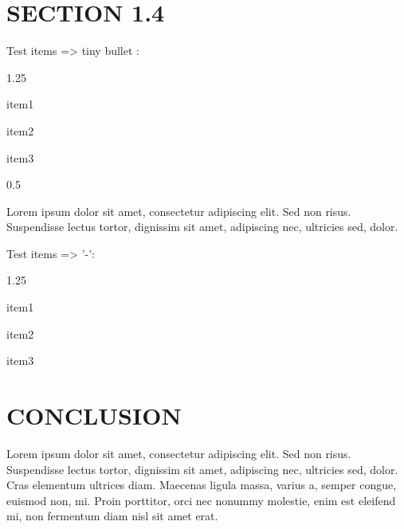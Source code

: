 \section{SECTION 1.4}
Test items => tiny bullet :
\renewcommand{\labelitemi}{\tiny$\bullet$}
\begin{itemize}[leftmargin=2cm, topsep=0pt]
        \begin{spacing}{1.25}
        \item item1
        \item item2
        \item item3
        \end{spacing}
\end{itemize}
\begin{spacing}{0.5}
\end{spacing}
Lorem ipsum dolor sit amet, consectetur adipiscing elit. Sed non risus. Suspendisse lectus tortor, dignissim sit amet, adipiscing nec, ultricies sed, dolor.

Test items => '-':
\renewcommand{\labelitemi}{\tiny$-$}
\begin{itemize}[leftmargin=2cm, topsep=0pt]
        \begin{spacing}{1.25}
        \item item1
        \item item2
        \item item3
        \end{spacing}
\end{itemize}


\section{CONCLUSION}
Lorem ipsum dolor sit amet, consectetur adipiscing elit. Sed non risus. Suspendisse lectus tortor, dignissim sit amet, adipiscing nec, ultricies sed, dolor. Cras elementum ultrices diam. Maecenas ligula massa, varius a, semper congue, euismod non, mi. Proin porttitor, orci nec nonummy molestie, enim est eleifend mi, non fermentum diam nisl sit amet erat. 